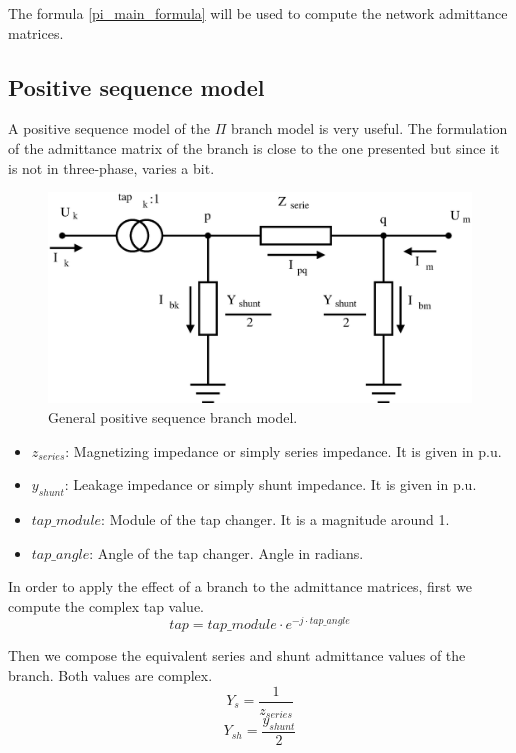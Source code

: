 \documentclass[a4paper,twoside,fleqn]{tufte-book}
\begin{document}
The formula \ref{pi_main_formula} will be used to compute the network admittance matrices.


\subsection{Positive sequence model}

A positive sequence model of the $\Pi$ branch model is very useful. The formulation of the admittance matrix of the branch is close to the one presented but since it is not in three-phase, varies a bit.

\begin{center}
	\begin{figure}[h]
		\includegraphics[width=0.5\linewidth]{img/pi-trafo.eps}
		\caption{General positive sequence branch model.}
		\label{pi_model_ps}
	\end{figure}
\end{center}

\begin{itemize}
	\item $z_{series}$: Magnetizing impedance or simply series impedance. It is given in p.u.
	\item $y_{shunt}$: Leakage impedance or simply shunt impedance. It is given in p.u.
	\item $tap\_module$: Module of the tap changer. It is a magnitude around 1.
	\item $tap\_angle$: Angle of the tap changer. Angle in radians.\newline
\end{itemize}



In order to apply the effect of a branch to the admittance matrices, first we compute the complex tap value.
$$tap = tap\_module \cdot e^{-j \cdot tap\_angle}$$  

Then we compose the equivalent series and shunt admittance values of the branch. Both values are complex.
$$Y_s = \frac{1}{z_{series}}$$
$$Y_{sh} = \frac{y_{shunt}}{2}$$
\end{document}
